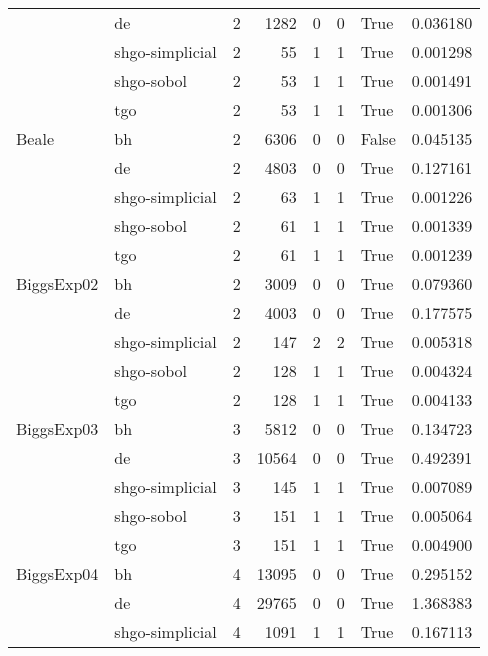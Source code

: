 \begin{longtable}{llrrrrlr}
         & de &     2 &     1282 &      0 &       0 &    True &    0.036180 \\
         & shgo-simplicial &     2 &       55 &      1 &       1 &    True &    0.001298 \\
         & shgo-sobol &     2 &       53 &      1 &       1 &    True &    0.001491 \\
         & tgo &     2 &       53 &      1 &       1 &    True &    0.001306 \\
Beale & bh &     2 &     6306 &      0 &       0 &   False &    0.045135 \\
         & de &     2 &     4803 &      0 &       0 &    True &    0.127161 \\
         & shgo-simplicial &     2 &       63 &      1 &       1 &    True &    0.001226 \\
         & shgo-sobol &     2 &       61 &      1 &       1 &    True &    0.001339 \\
         & tgo &     2 &       61 &      1 &       1 &    True &    0.001239 \\
BiggsExp02 & bh &     2 &     3009 &      0 &       0 &    True &    0.079360 \\
         & de &     2 &     4003 &      0 &       0 &    True &    0.177575 \\
         & shgo-simplicial &     2 &      147 &      2 &       2 &    True &    0.005318 \\
         & shgo-sobol &     2 &      128 &      1 &       1 &    True &    0.004324 \\
         & tgo &     2 &      128 &      1 &       1 &    True &    0.004133 \\
BiggsExp03 & bh &     3 &     5812 &      0 &       0 &    True &    0.134723 \\
         & de &     3 &    10564 &      0 &       0 &    True &    0.492391 \\
         & shgo-simplicial &     3 &      145 &      1 &       1 &    True &    0.007089 \\
         & shgo-sobol &     3 &      151 &      1 &       1 &    True &    0.005064 \\
         & tgo &     3 &      151 &      1 &       1 &    True &    0.004900 \\
BiggsExp04 & bh &     4 &    13095 &      0 &       0 &    True &    0.295152 \\
         & de &     4 &    29765 &      0 &       0 &    True &    1.368383 \\
         & shgo-simplicial &     4 &     1091 &      1 &       1 &    True &    0.167113 \\

\end{longtable}

